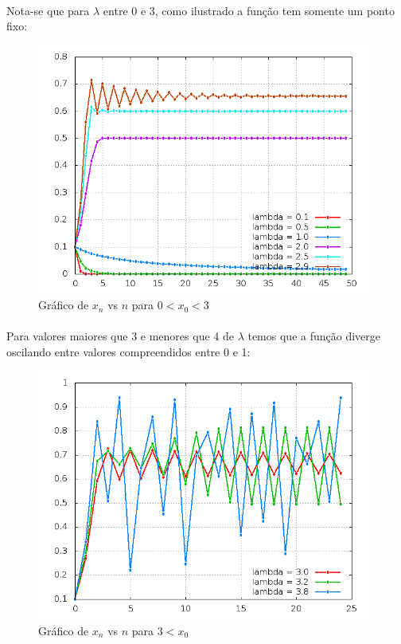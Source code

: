 \documentclass[a4paper,11pt]{article}
\begin{document}
\paragraph{}Nota-se que para $\lambda$ entre 0 e 3, como ilustrado a função tem somente um ponto fixo:
\begin{figure}[H]
\includegraphics[width=11cm]{../image/questao2b1.png}
\centering
\caption{Gráfico de $x_n$ vs $n$ para $0<x_0<3$}
\end{figure}

\paragraph{}Para valores maiores que 3 e menores que 4 de $\lambda$ temos que a função diverge oscilando entre valores compreendidos entre 0 e 1:

\begin{figure}[H]
\includegraphics[width=11cm]{../image/questao2b2.png}
\centering
\caption{Gráfico de $x_n$ vs $n$ para $3<x_0$}
\end{figure}
\end{document}
